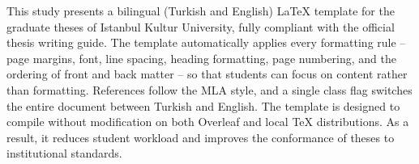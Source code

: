 This study presents a bilingual (Turkish and English) LaTeX template for the
graduate theses of Istanbul Kultur University, fully compliant with the
official thesis writing guide.
The template automatically applies every formatting rule -- page margins, font,
line spacing, heading formatting, page numbering, and the ordering of front and
back matter -- so that students can focus on content rather than formatting.
References follow the MLA style, and a single class flag switches the entire
document between Turkish and English.
The template is designed to compile without modification on both Overleaf and
local TeX distributions.
As a result, it reduces student workload and improves the conformance of theses
to institutional standards.
